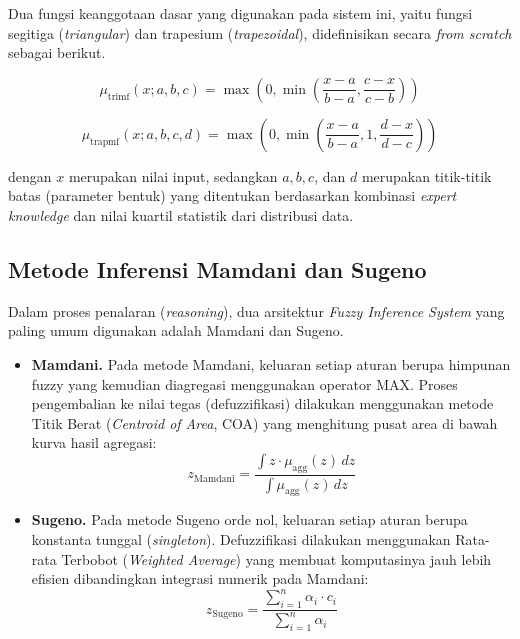 \documentclass[11pt,a4paper]{article}
\begin{document}
Dua fungsi keanggotaan dasar yang digunakan pada sistem ini, yaitu fungsi segitiga (\textit{triangular}) dan trapesium (\textit{trapezoidal}), didefinisikan secara \textit{from scratch} sebagai berikut.

\begin{equation}
\mu_{\text{trimf}}(x; a, b, c) = \max\left(0, \min\left(\frac{x-a}{b-a}, \frac{c-x}{c-b}\right)\right)
\end{equation}

\begin{equation}
\mu_{\text{trapmf}}(x; a, b, c, d) = \max\left(0, \min\left(\frac{x-a}{b-a}, 1, \frac{d-x}{d-c}\right)\right)
\end{equation}

\noindent dengan $x$ merupakan nilai input, sedangkan $a, b, c$, dan $d$ merupakan titik-titik batas (parameter bentuk) yang ditentukan berdasarkan kombinasi \textit{expert knowledge} dan nilai kuartil statistik dari distribusi data.

\subsection{Metode Inferensi Mamdani dan Sugeno}
Dalam proses penalaran (\textit{reasoning}), dua arsitektur \textit{Fuzzy Inference System} yang paling umum digunakan adalah Mamdani dan Sugeno.
\begin{itemize}
    \item \textbf{Mamdani.} Pada metode Mamdani, keluaran setiap aturan berupa himpunan fuzzy yang kemudian diagregasi menggunakan operator MAX. Proses pengembalian ke nilai tegas (defuzzifikasi) dilakukan menggunakan metode Titik Berat (\textit{Centroid of Area}, COA) yang menghitung pusat area di bawah kurva hasil agregasi:
    \begin{equation}
    z_{\text{Mamdani}} = \frac{\int z \cdot \mu_{\text{agg}}(z) \, dz}{\int \mu_{\text{agg}}(z) \, dz}
    \end{equation}
    
    \item \textbf{Sugeno.} Pada metode Sugeno orde nol, keluaran setiap aturan berupa konstanta tunggal (\textit{singleton}). Defuzzifikasi dilakukan menggunakan Rata-rata Terbobot (\textit{Weighted Average}) yang membuat komputasinya jauh lebih efisien dibandingkan integrasi numerik pada Mamdani:
    \begin{equation}
    z_{\text{Sugeno}} = \frac{\sum_{i=1}^{n} \alpha_i \cdot c_i}{\sum_{i=1}^{n} \alpha_i}
    \end{equation}
\end{itemize}
\end{document}
